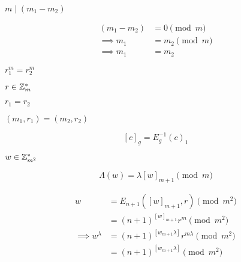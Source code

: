 \documentclass[10pt]{book}
\begin{document}
\begin{mdSnippets}
\begin{mdInlineSnippet}[0f0f72548b5414bc3c9ec0b0e120383d]
$m \mid (m_1 - m_2)$\end{mdInlineSnippet}%
\begin{mdDisplaySnippet}[398b7025c729d835a7f8b95d5e78f3de]%
\[%
\begin{aligned}
(m_1 - m_2) &= 0 \pmod m \\
\implies m_1 &= m_2 \pmod m \\
\implies m_1 &= m_2
\end{aligned}
\]%
\end{mdDisplaySnippet}%
\begin{mdInlineSnippet}%
$r_1^m = r_2^m$\end{mdInlineSnippet}%
\begin{mdInlineSnippet}[ad2a429e655b109821b86f87d6db49dd]%
$r \in \mathbb{Z}^*_m$\end{mdInlineSnippet}%
\begin{mdInlineSnippet}%
$r_1 = r_2$\end{mdInlineSnippet}%
\begin{mdInlineSnippet}[571812ae2f9b1c852f73fb86871486fb]%
$(m_1,r_1) = (m_2, r_2)$\end{mdInlineSnippet}%
\begin{mdDisplaySnippet}%
\[%
[c]_g = E_g^{-1}(c)_1
\]%
\end{mdDisplaySnippet}%
\begin{mdInlineSnippet}[4fa646f2c1a1f6eb0eb33dfffbde091d]%
$w \in \mathbb{Z}_{m^2}^*$\end{mdInlineSnippet}%
\begin{mdDisplaySnippet}%
\[%
\Lambda(w) = \lambda [w]_{m+1} \pmod {m}
\]%
\end{mdDisplaySnippet}%
\begin{mdDisplaySnippet}%
\[%
\begin{aligned}
  w &= E_{n+1}([w]_{m+1}, r) \pmod{m^2} \\ 
  &= (n+1)^{[w]_{m+1}}r^m \pmod{m^2} \\
  \implies w^{\lambda} &= (n+1)^{[w_{m+1}\lambda]}r^{m\lambda} \pmod{m^2} \\
  &= (n+1)^{[w_{m+1}\lambda]} \pmod{m^2} \\

\end{aligned}\]
\end{mdDisplaySnippet}
\end{mdSnippets}
\end{document}
